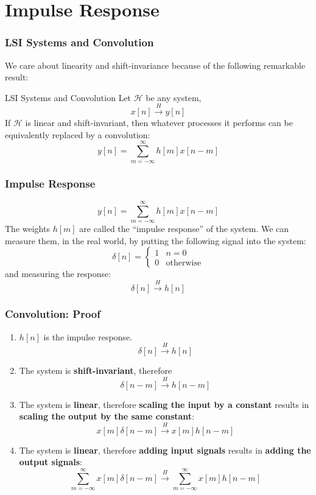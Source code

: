 \documentclass{beamer}
\begin{document}
\section[Convolution]{Impulse Response}
\setcounter{subsection}{1}

\begin{frame}
  \frametitle{LSI Systems and Convolution}

  We care about linearity and shift-invariance because of the
  following remarkable result:
  \begin{block}{LSI Systems and Convolution}
    Let ${\mathcal H}$ be any system,
    \[
    x[n]\stackrel{H}{\longrightarrow} y[n]
    \]
    If ${\mathcal H}$ is linear and shift-invariant, then whatever
    processes it performs can be equivalently replaced by a
    convolution:
    \[
    y[n] = \sum_{m=-\infty}^\infty h[m] x[n-m]
    \]
  \end{block}
\end{frame}

\begin{frame}
  \frametitle{Impulse Response}

  \[
  y[n] = \sum_{m=-\infty}^\infty h[m] x[n-m]
  \]
  The weights $h[m]$ are called the ``impulse response'' of the
  system.  We can measure them, in the real world, by putting the
  following signal into the system:
  \[
  \delta[n] = \begin{cases} 1 & n=0\\ 0 & \mbox{otherwise}
  \end{cases}
  \]
  and measuring the response:
  \[
  \delta[n] \stackrel{H}{\longrightarrow} h[n]
  \]
\end{frame}



\begin{frame}
  \frametitle{Convolution: Proof}
  \begin{enumerate}
  \item $h[n]$ is the impulse response.
    \[
    \delta[n] \stackrel{H}{\longrightarrow} h[n]
    \]
  \item The system is {\bf shift-invariant}, therefore
    \[
    \delta[n-m] \stackrel{H}{\longrightarrow} h[n-m]
    \]
  \item The system is {\bf linear}, therefore {\bf scaling the input
    by a constant} results in {\bf scaling the output by the same
    constant}:
    \[
    x[m]\delta[n-m] \stackrel{H}{\longrightarrow} x[m]h[n-m]
    \]
  \item The system is {\bf linear}, therefore {\bf adding input
    signals} results in {\bf adding the output signals}:
    \[
    \sum_{m=-\infty}^\infty x[m]\delta[n-m]
    \stackrel{H}{\longrightarrow} \sum_{m=-\infty}^\infty x[m]h[n-m]
    \]
  \end{enumerate}
\end{frame}
\end{document}
